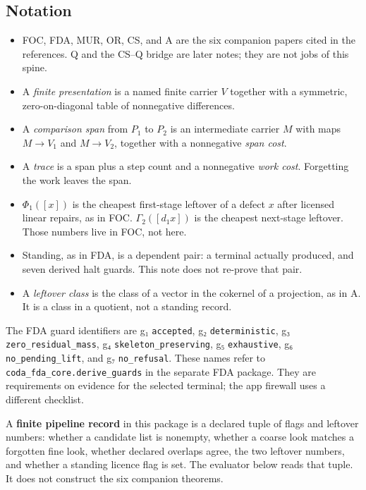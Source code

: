 \documentclass[
  11pt,
]{article}
\providecommand{\tightlist}{%
  \setlength{\itemsep}{0pt}\setlength{\parskip}{0pt}}
\begin{document}
\subsection{Notation}\label{notation}

\begin{itemize}
\tightlist
\item
  FOC, FDA, MUR, OR, CS, and A are the six companion papers cited in the references. Q and the CS--Q bridge are later notes; they are not jobs of this spine.
\item
  A \emph{finite presentation} is a named finite carrier \(V\) together with a symmetric, zero-on-diagonal table of nonnegative differences.
\item
  A \emph{comparison span} from \(P_1\) to \(P_2\) is an intermediate carrier \(M\) with maps \(M\to V_1\) and \(M\to V_2\), together with a nonnegative \emph{span cost}.
\item
  A \emph{trace} is a span plus a step count and a nonnegative \emph{work cost}. Forgetting the work leaves the span.
\item
  \(\Phi_1([x])\) is the cheapest first-stage leftover of a defect \(x\) after licensed linear repairs, as in FOC. \(\Gamma_2([d_1 x])\) is the cheapest next-stage leftover. Those numbers live in FOC, not here.
\item
  Standing, as in FDA, is a dependent pair: a terminal actually produced, and seven derived halt guards. This note does not re-prove that pair.
\item
  A \emph{leftover class} is the class of a vector in the cokernel of a projection, as in A. It is a class in a quotient, not a standing record.
\end{itemize}

The FDA guard identifiers are g₁ \texttt{accepted}, g₂ \texttt{deterministic}, g₃ \texttt{zero\_residual\_mass}, g₄ \nolinkurl{skeleton_preserving}, g₅ \texttt{exhaustive}, g₆ \texttt{no\_pending\_lift}, and g₇ \texttt{no\_refusal}. These names refer to \nolinkurl{coda_fda_core.derive_guards} in the separate FDA package. They are requirements on evidence for the selected terminal; the app firewall uses a different checklist.

A \textbf{finite pipeline record} in this package is a declared tuple of flags and leftover numbers: whether a candidate list is nonempty, whether a coarse look matches a forgotten fine look, whether declared overlaps agree, the two leftover numbers, and whether a standing licence flag is set. The evaluator below reads that tuple. It does not construct the six companion theorems.
\end{document}
